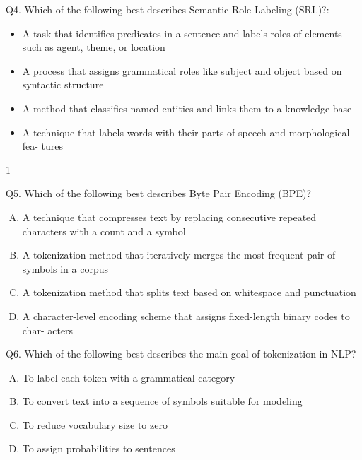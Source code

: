 \documentclass[11pt]{article}
\begin{document}
\vspace{0.5em}

\noindent Q4. Which of the following best describes Semantic Role Labeling (SRL)?:

\begin{itemize}
\item[(A)] A task that identifies predicates in a sentence and labels roles of elements such as
agent, theme, or location
\item[(B)] A process that assigns grammatical roles like subject and object based on syntactic
structure
\item[(C)] A method that classifies named entities and links them to a knowledge base
\item[(D)] A technique that labels words with their parts of speech and morphological fea-
tures
\end{itemize}

\begin{center}
1
\end{center}

\clearpage

Q5. Which of the following best describes Byte Pair Encoding (BPE)?

\begin{enumerate}[(A)]
\item A technique that compresses text by replacing consecutive repeated characters
with a count and a symbol
\item A tokenization method that iteratively merges the most frequent pair of symbols
in a corpus
\item A tokenization method that splits text based on whitespace and punctuation
\item A character-level encoding scheme that assigns fixed-length binary codes to char-
acters
\end{enumerate}

Q6. Which of the following best describes the main goal of tokenization in NLP?

\begin{enumerate}[(A)]
\item To label each token with a grammatical category
\item To convert text into a sequence of symbols suitable for modeling
\item To reduce vocabulary size to zero
\item To assign probabilities to sentences
\end{enumerate}
\end{document}
